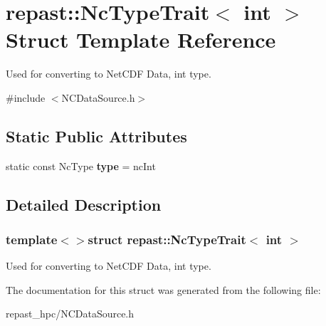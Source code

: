 \hypertarget{structrepast_1_1_nc_type_trait_3_01int_01_4}{\section{repast\-:\-:Nc\-Type\-Trait$<$ int $>$ Struct Template Reference}
\label{structrepast_1_1_nc_type_trait_3_01int_01_4}
}


Used for converting to Net\-C\-D\-F Data, int type.  




{\ttfamily \#include $<$N\-C\-Data\-Source.\-h$>$}

\subsection*{Static Public Attributes}
\begin{DoxyCompactItemize}
\item 
\hypertarget{structrepast_1_1_nc_type_trait_3_01int_01_4_a561856ea039727017e32a5d1313fad5b}{static const Nc\-Type {\bfseries type} = nc\-Int}\label{structrepast_1_1_nc_type_trait_3_01int_01_4_a561856ea039727017e32a5d1313fad5b}

\end{DoxyCompactItemize}


\subsection{Detailed Description}
\subsubsection*{template$<$$>$struct repast\-::\-Nc\-Type\-Trait$<$ int $>$}

Used for converting to Net\-C\-D\-F Data, int type. 

The documentation for this struct was generated from the following file\-:\begin{DoxyCompactItemize}
\item 
repast\-\_\-hpc/N\-C\-Data\-Source.\-h\end{DoxyCompactItemize}
